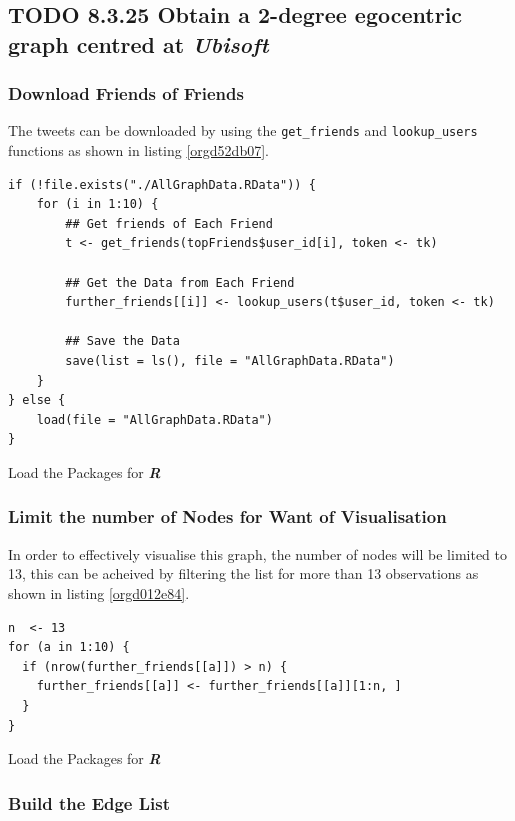 \documentclass[11pt]{article}
\begin{document}
\subsection{{\bfseries\sffamily TODO} 8.3.25 Obtain a \textbf{2-degree} egocentric graph centred at \emph{Ubisoft}}
\label{sec:orgae22f00}
\subsubsection{Download Friends of Friends}
\label{sec:org651a039}

The tweets can be downloaded by using the \texttt{get\_friends} and \texttt{lookup\_users}
functions as shown in listing \ref{orgd52db07}.

\begin{listing}[htbp]
\begin{verbatim}
if (!file.exists("./AllGraphData.RData")) {
    for (i in 1:10) {
        ## Get friends of Each Friend
        t <- get_friends(topFriends$user_id[i], token <- tk)

        ## Get the Data from Each Friend
        further_friends[[i]] <- lookup_users(t$user_id, token <- tk)

        ## Save the Data
        save(list = ls(), file = "AllGraphData.RData")
    }
} else {
    load(file = "AllGraphData.RData")
}

\end{verbatim}
\caption{\label{orgd52db07}Load the Packages for \textbf{\textbf{\emph{R}}}}
\end{listing}

\subsubsection{Limit the number of Nodes for Want of Visualisation}
\label{sec:org9962322}
In order to effectively visualise this graph, the number of nodes will be limited to 13, this can be acheived by filtering the list for more than 13 observations as shown in listing \ref{orgd012e84}.

\begin{listing}[htbp]
\begin{verbatim}
n  <- 13
for (a in 1:10) {
  if (nrow(further_friends[[a]]) > n) {
    further_friends[[a]] <- further_friends[[a]][1:n, ]
  }
}
\end{verbatim}
\caption{\label{orgd012e84}Load the Packages for \textbf{\textbf{\emph{R}}}}
\end{listing}

\subsubsection{Build the Edge List}
\label{sec:org0106268}
\end{document}
